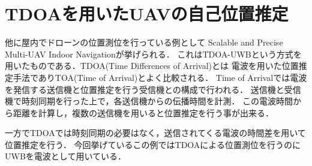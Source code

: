 \section{TDOAを用いたUAVの自己位置推定}
他に屋内でドローンの位置測位を行っている例として
Scalable and Precise Multi-UAV Indoor Navigation\cite{TDOA-UWB}が挙げられる．
これはTDOA-UWBという方式を用いたものである．TDOA(Time Differences of Arrival)とは
電波を用いた位置推定手法でありTOA(Time of Arrival)とよく比較される．
Time of Arrivalでは電波を発信する送信機と位置推定を行う受信機との構成で行われる．
送信機と受信機で時刻同期を行った上で，各送信機からの伝播時間を計測．
この電波時間から距離を計算し，複数の送信機を用いると位置推定を行う事が出来る．

一方でTDOAでは時刻同期の必要はなく，送信されてくる電波の時間差を用いて位置推定を行う．
今回挙げているこの例ではTDOAによる位置測位を行うのにUWBを電波として用いている．


